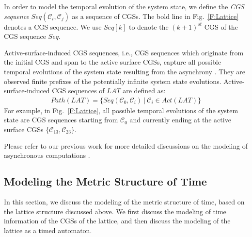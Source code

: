 \documentclass[10pt,conference,compsocconf,letterpaper]{IEEEtran}
\begin{document}
In order to model the temporal evolution of the system state, we define the {\it CGS sequence} $Seq(\mathcal{C}_i, \mathcal{C}_j)$ as a sequence of CGSs. The bold line in Fig.~\ref{F:Lattice} denotes a CGS sequence. We use $Seq[k]$ to denote the $(k+1)^{st}$ CGS of the CGS sequence $Seq$.
\iffalse
To capture the on-going temporal evolution of the system, we are concerned with the active-surface-induced CGS sequences, that is, CGS sequences which originate from the initial CGS and currently end at the active surface CGSs:
\begin{eqnarray*}
  Evol(LAT) = \{Seq(\mathcal{C}_0,\mathcal{C}_i)~|~\mathcal{C}_i\in Act(LAT)\}
\end{eqnarray*}
\noindent The reason is that these CGS sequences capture all possible temporal evolutions of the system state. For example, in Fig.~\ref{F:Lattice}, the bold broken line indicates a CGS sequence starting from $\mathcal{C}_0$ and ending at $\mathcal{C}_{44}$, and all possible temporal evolutions of the system state are CGS sequences starting from $\mathcal{C}_0$ and currently ending at CGSs in $\{\mathcal{C}_{24}, \mathcal{C}_{34}, \mathcal{C}_{44}\}$.
\fi
Active-surface-induced CGS sequences, i.e., CGS sequences which originate from the initial CGS and
span to the active surface CGSs, capture all possible temporal evolutions of the system state resulting from the asynchrony \cite{Yang13}. They are observed finite prefixes of the potentially infinite system state evolutions. Active-surface-induced CGS sequences of $LAT$ are defined as:
\begin{eqnarray*}
  Path(LAT) = \{Seq(\mathcal{C}_0,\mathcal{C}_i)~|~\mathcal{C}_i\in Act(LAT)\}
\end{eqnarray*}
For example, in Fig.~\ref{F:Lattice}, all possible temporal evolutions of the system state are CGS sequences starting from $\mathcal{C}_0$ and currently ending at the active surface CGSs $\{\mathcal{C}_{13}, \mathcal{C}_{23}\}$.

Please refer to our previous work for more detailed discussions on the modeling of asynchronous computations \cite{Yang13, Huang12, Wei12, Yang14}.

\subsection{Modeling the Metric Structure of Time}

In this section, we discuss the modeling of the metric structure of time, based on the lattice structure discussed above. We first discuss the modeling of time information of the CGSs of the lattice, and then discuss the modeling of the lattice as a timed automaton.
\end{document}
